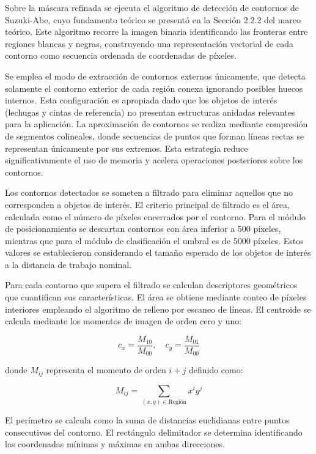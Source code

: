 Sobre la máscara refinada se ejecuta el algoritmo de detección de contornos de Suzuki-Abe, cuyo fundamento teórico se presentó en la Sección 2.2.2 del marco teórico. Este algoritmo recorre la imagen binaria identificando las fronteras entre regiones blancas y negras, construyendo una representación vectorial de cada contorno como secuencia ordenada de coordenadas de píxeles.

Se emplea el modo de extracción de contornos externos únicamente, que detecta solamente el contorno exterior de cada región conexa ignorando posibles huecos internos. Esta configuración es apropiada dado que los objetos de interés (lechugas y cintas de referencia) no presentan estructuras anidadas relevantes para la aplicación. La aproximación de contornos se realiza mediante compresión de segmentos colineales, donde secuencias de puntos que forman líneas rectas se representan únicamente por sus extremos. Esta estrategia reduce significativamente el uso de memoria y acelera operaciones posteriores sobre los contornos.

Los contornos detectados se someten a filtrado para eliminar aquellos que no corresponden a objetos de interés. El criterio principal de filtrado es el área, calculada como el número de píxeles encerrados por el contorno. Para el módulo de posicionamiento se descartan contornos con área inferior a 500 píxeles, mientras que para el módulo de clasificación el umbral es de 5000 píxeles. Estos valores se establecieron considerando el tamaño esperado de los objetos de interés a la distancia de trabajo nominal.

Para cada contorno que supera el filtrado se calculan descriptores geométricos que cuantifican sus características. El área se obtiene mediante conteo de píxeles interiores empleando el algoritmo de relleno por escaneo de líneas. El centroide se calcula mediante los momentos de imagen de orden cero y uno:

\begin{equation}
c_x = \frac{M_{10}}{M_{00}}, \quad c_y = \frac{M_{01}}{M_{00}}
\end{equation}

donde $M_{ij}$ representa el momento de orden $i+j$ definido como:

\begin{equation}
M_{ij} = \sum_{(x,y) \in \text{Región}} x^i y^j
\end{equation}

El perímetro se calcula como la suma de distancias euclidianas entre puntos consecutivos del contorno. El rectángulo delimitador se determina identificando las coordenadas mínimas y máximas en ambas direcciones.


